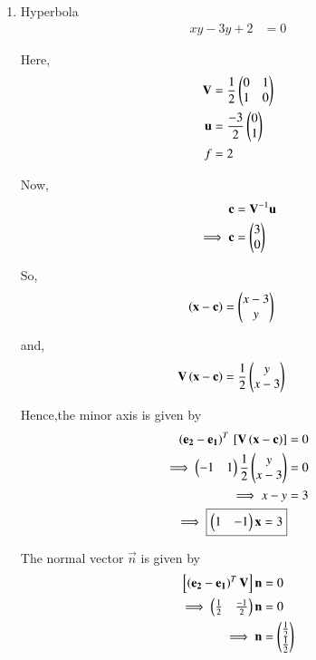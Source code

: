 \documentclass[journal,12pt,twocolumn]{IEEEtran}
\begin{document}
\begin{enumerate}
    \item Hyperbola
    \begin{align}
        xy-3y+2 &= 0
    \end{align}
    
    Here,
    \begin{align}
    \mathbf{V} &= \frac{1}{2}\begin{pmatrix}0 & 1 \\ 1 & 0\end{pmatrix} \\
    \mathbf{u} &= \frac{-3}{2}\begin{pmatrix}0 \\ 1\end{pmatrix} \\
    f &= 2
    \end{align}

    Now,
    \begin{align}
    \mathbf{c} &= \mathbf{V}^{-1}\mathbf{u}\\
    \implies \mathbf{c} &= \begin{pmatrix}3 \\ 0\end{pmatrix}
    \end{align}

    So,
    \begin{align}
    \left(\mathbf{x}-\mathbf{c}\right) &= \begin{pmatrix}x-3 \\ y\end{pmatrix}
    \end{align}

    and,
    \begin{align}
    \mathbf{V}\left(\mathbf{x}-\mathbf{c}\right) &= \frac{1}{2}\begin{pmatrix}y \\ x-3\end{pmatrix}
    \end{align}

    Hence,the minor axis is given by
    \begin{align}
    \left(\mathbf{e_2}-\mathbf{e_1}\right)^T{}\left[\mathbf{V}\left(\mathbf{x}-\mathbf{c}\right)\right] &= 0 \\
    \implies \begin{pmatrix}-1 & 1\end{pmatrix}\frac{1}{2}\begin{pmatrix}y \\ x-3\end{pmatrix} &= 0 \\
    \implies x-y &= 3 \\
    \implies \boxed{\begin{pmatrix}1 & -1\end{pmatrix}\mathbf{x} = 3}
    \end{align}
    
    The normal vector $\vec{n}$ is given by
    \begin{align}
        {}\left[\left(\mathbf{e_2}-\mathbf{e_1}\right)^T\mathbf{V}\right]\mathbf{n} &= 0
        \\
        \implies \begin{pmatrix}\frac{1}{2} & \frac{-1}{2}\end{pmatrix}\mathbf{n} &= 0
        \\
        \implies \mathbf{n} &= \begin{pmatrix}\frac{1}{2} \\ \frac{1}{2}\end{pmatrix}
    \end{align}
    

\end{enumerate}
\end{document}
